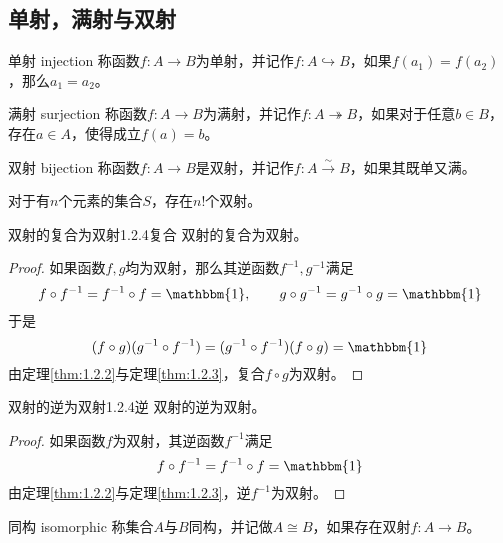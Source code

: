 \subsection{单射，满射与双射}

\begin{definition}{单射 injection}
	称函数$f:A\to B$为单射，并记作$f:A\hookrightarrow B$，如果$f(a_1)=f(a_2)$，那么$a_1=a_2$。
\end{definition}

\begin{definition}{满射 surjection}
	称函数$f:A\to B$为满射，并记作$f:A\twoheadrightarrow B$，如果对于任意$b\in B$，存在$a\in A$，使得成立$f(a)=b$。
\end{definition}

\begin{definition}{双射 bijection}
	称函数$f:A\to B$是双射，并记作$f:A\xrightarrow{\sim}B$，如果其既单又满。
\end{definition}

\begin{remark}
	对于有$n$个元素的集合$S$，存在$n!$个双射。
\end{remark}

\begin{proposition}{双射的复合为双射}{1.2.4复合}
	双射的复合为双射。
\end{proposition}

\begin{proof}
	如果函数$f,g$均为双射，那么其逆函数$f^{-1},g^{-1}$满足
	$$
	f\circ f^{-1}=f^{-1}\circ f=\mathbbm{1},\qquad 
	g\circ g^{-1}=g^{-1}\circ g=\mathbbm{1}
	$$
	于是
	$$
	(f\circ g)(g^{-1}\circ f^{-1})=(g^{-1}\circ f^{-1})(f\circ g)=\mathbbm{1}
	$$
	由定理\ref{thm:1.2.2}与定理\ref{thm:1.2.3}，复合$f\circ g$为双射。
\end{proof}

\begin{proposition}{双射的逆为双射}{1.2.4逆}
	双射的逆为双射。
\end{proposition}

\begin{proof}
	如果函数$f$为双射，其逆函数$f^{-1}$满足
	$$
	f\circ f^{-1}=f^{-1}\circ f=\mathbbm{1}
	$$
	由定理\ref{thm:1.2.2}与定理\ref{thm:1.2.3}，逆$f^{-1}$为双射。
\end{proof}

\begin{definition}{同构 isomorphic}
	称集合$A$与$B$同构，并记做$A\cong B$，如果存在双射$f:A\to B$。
\end{definition}

